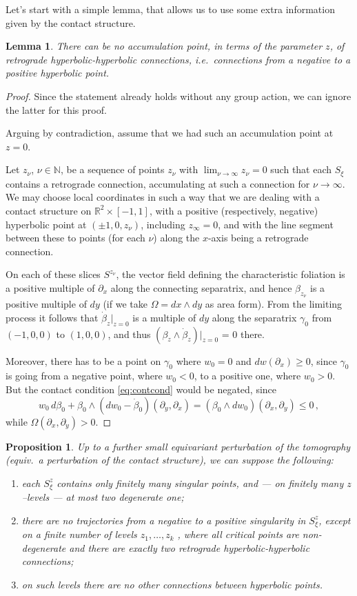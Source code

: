 \documentclass[a4paper, 11pt]{amsart}
\theoremstyle{plain}
\newtheorem{prop}{Proposition}[section]
\newtheorem{lemma}[lemma]{Lemma}
\theoremstyle{definition}
\newcommand{\R}{\mathbb{R}}
\begin{document}
Let's start with a simple lemma, that allows us to use some extra information given by the contact structure.
\begin{lemma}
	There can be no accumulation point, in terms of the parameter $z$, of retrograde hyperbolic-hyperbolic connections, i.e.\ connections from a negative to a positive hyperbolic point.
\end{lemma}
\begin{proof}
	 Since the statement already holds without any group action, we can ignore the latter for this proof.
	 
	 Arguing by contradiction, assume that we had such an accumulation point at $z = 0$. 
	 
	 Let $z_\nu$, $\nu \in \mathbb{N}$, be a sequence of points $z_\nu$ with $\lim_{\nu \to \infty} z_\nu = 0$ such that each $S_\xi$ contains a retrograde connection, accumulating at such a connection for $\nu \to \infty$. We may choose local coordinates in such a way that we are dealing with a contact structure on $\R^2 \times [-1, 1]$, with a positive (respectively, negative) hyperbolic point at $(\pm1, 0, z_\nu)$, including $z_\infty = 0$, and with the line segment between these to points (for each $\nu$) along the $x$-axis being a retrograde connection. 
	 
	 On each of these slices $S^{z_\nu}$, the vector field defining the characteristic foliation is a positive multiple of $\partial_x$ along the connecting separatrix, and hence $\beta_{z_\nu}$ is a positive multiple of $dy$ (if we take $\Omega = dx \wedge dy$ as area form). From the limiting process it follows that $\dot{\beta}_z|_{z =0}$ is a multiple of $dy$ along the separatrix $\gamma_0$ from $(-1, 0, 0)$ to $(1, 0, 0)$, and thus $(\beta_z \wedge \dot{\beta}_z)|_{z =0}$ = 0 there. 
	 
	 Moreover, there has to be a point on $\gamma_0$ where $w_0 = 0$ and $dw(\partial_x) \ge 0$, since $\gamma_0$ is going from a negative point, where $w_0 < 0$, to a positive one, where $w_0 > 0$. But the contact condition \eqref{eq:contcond} would be negated, since
	 \[
	 	w_0\,d\beta_0 + \beta_0 \wedge (dw_0 - \dot{\beta}_0)(\partial_y, \partial_x) = (\beta_0 \wedge dw_0)(\partial_x, \partial_y)\le 0\,,
	 \]
	 while $\Omega(\partial_x, \partial_y) > 0$.
\end{proof}
\begin{prop}\label{genfilm}
Up to a further small equivariant perturbation of the tomography (equiv.\ a perturbation of the contact structure), we can suppose the following:
\begin{enumerate}
	\item each $S_\xi^z$ contains only finitely many singular points, and --- on finitely many $z$–levels --- at most two degenerate one;
	\item there are no trajectories from a negative to a positive singularity in $S_\xi^z$, except on a finite number of levels $z_1,\dots, z_k$ , where all critical points are non-degenerate and there are exactly two retrograde hyperbolic-hyperbolic connections;
	\item on such levels there are no other connections between hyperbolic points.
\end{enumerate}
\end{prop}
\end{document}
